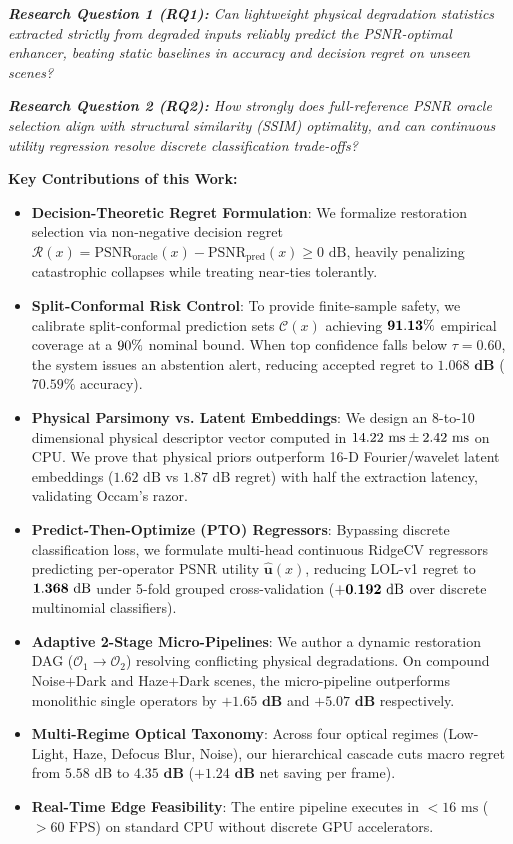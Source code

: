 \documentclass[journal]{IEEEtran}
\begin{document}
\noindent\textit{\textbf{Research Question 1 (RQ1):} Can lightweight physical degradation statistics extracted strictly from degraded inputs reliably predict the PSNR-optimal enhancer, beating static baselines in accuracy and decision regret on unseen scenes?}

\noindent\textit{\textbf{Research Question 2 (RQ2):} How strongly does full-reference PSNR oracle selection align with structural similarity (SSIM) optimality, and can continuous utility regression resolve discrete classification trade-offs?}

\noindent\textbf{Key Contributions of this Work:}
\begin{itemize}
    \setlength{\itemsep}{1pt}
    \setlength{\parskip}{0pt}
    \item \textbf{Decision-Theoretic Regret Formulation}: We formalize restoration selection via non-negative decision regret $\mathcal{R}(x) = \text{PSNR}_{\text{oracle}}(x) - \text{PSNR}_{\text{pred}}(x) \ge 0\text{ dB}$, heavily penalizing catastrophic collapses while treating near-ties tolerantly.
    \item \textbf{Split-Conformal Risk Control}: To provide finite-sample safety, we calibrate split-conformal prediction sets $\mathcal{C}(x)$ achieving $\mathbf{91.13\%}$ empirical coverage at a $90\%$ nominal bound. When top confidence falls below $\tau = 0.60$, the system issues an abstention alert, reducing accepted regret to $\mathbf{1.068\text{ dB}}$ ($70.59\%$ accuracy).
    \item \textbf{Physical Parsimony vs. Latent Embeddings}: We design an 8-to-10 dimensional physical descriptor vector computed in $14.22\text{ ms} \pm 2.42\text{ ms}$ on CPU. We prove that physical priors outperform 16-D Fourier/wavelet latent embeddings ($1.62\text{ dB}$ vs $1.87\text{ dB}$ regret) with half the extraction latency, validating Occam's razor.
    \item \textbf{Predict-Then-Optimize (PTO) Regressors}: Bypassing discrete classification loss, we formulate multi-head continuous RidgeCV regressors predicting per-operator PSNR utility $\hat{\mathbf{u}}(x)$, reducing LOL-v1 regret to $\mathbf{1.368\text{ dB}}$ under 5-fold grouped cross-validation ($\mathbf{+0.192\text{ dB}}$ over discrete multinomial classifiers).
    \item \textbf{Adaptive 2-Stage Micro-Pipelines}: We author a dynamic restoration DAG ($\mathcal{O}_1 \to \mathcal{O}_2$) resolving conflicting physical degradations. On compound Noise+Dark and Haze+Dark scenes, the micro-pipeline outperforms monolithic single operators by $\mathbf{+1.65\text{ dB}}$ and $\mathbf{+5.07\text{ dB}}$ respectively.
    \item \textbf{Multi-Regime Optical Taxonomy}: Across four optical regimes (Low-Light, Haze, Defocus Blur, Noise), our hierarchical cascade cuts macro regret from $5.58\text{ dB}$ to $\mathbf{4.35\text{ dB}}$ ($\mathbf{+1.24\text{ dB}}$ net saving per frame).
    \item \textbf{Real-Time Edge Feasibility}: The entire pipeline executes in $< 16\text{ ms}$ ($> 60\text{ FPS}$) on standard CPU without discrete GPU accelerators.
\end{itemize}
\end{document}
